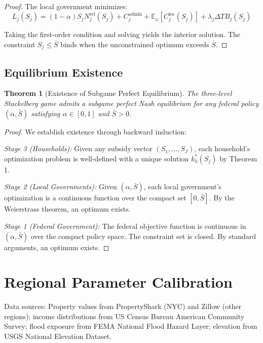 \documentclass[12pt,a4paper]{article}
\newtheorem{theorem}{Theorem}
\begin{document}
\begin{proof}
The local government minimizes:
\[
L_j(S_j) = (1-\alpha) S_j N_j^{\text{rel}}(S_j) + C_j^{\text{admin}} + \mathbb{E}_\omega[C_j^{\text{loc}}(S_j)] + \lambda_j \Delta TB_j(S_j)
\]

Taking the first-order condition and solving yields the interior solution. The constraint $S_j \leq \bar{S}$ binds when the unconstrained optimum exceeds $\bar{S}$.
\end{proof}

\subsection{Equilibrium Existence}

\begin{theorem}[Existence of Subgame Perfect Equilibrium]
The three-level Stackelberg game admits a subgame perfect Nash equilibrium for any federal policy $(\alpha, \bar{S})$ satisfying $\alpha \in [0,1]$ and $\bar{S} > 0$.
\end{theorem}

\begin{proof}
We establish existence through backward induction:

\textit{Stage 3 (Households):} Given any subsidy vector $(S_1, \ldots, S_J)$, each household's optimization problem is well-defined with a unique solution $k_h^*(S_j)$ by Theorem 1.

\textit{Stage 2 (Local Governments):} Given $(\alpha, \bar{S})$, each local government's optimization is a continuous function over the compact set $[0, \bar{S}]$. By the Weierstrass theorem, an optimum exists.

\textit{Stage 1 (Federal Government):} The federal objective function is continuous in $(\alpha, \bar{S})$ over the compact policy space. The constraint set is closed. By standard arguments, an optimum exists.
\end{proof}

\section{Regional Parameter Calibration}\label{app:parameters}

Data sources: Property values from PropertyShark (NYC) and Zillow (other regions); income distributions from US Census Bureau American Community Survey; flood exposure from FEMA National Flood Hazard Layer; elevation from USGS National Elevation Dataset.
\end{document}
